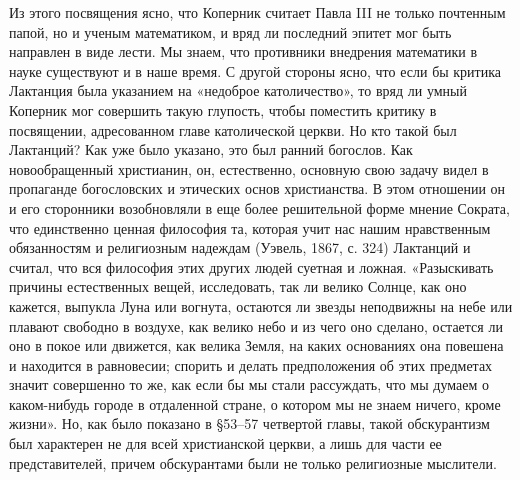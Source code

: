 Из этого  посвящения ясно,  что Коперник считает  Павла III  не только
почтенным папой, но  и ученым математиком, и вряд  ли последний эпитет
мог быть  направлен в виде  лести. Мы знаем, что  противники внедрения
математики  в  науке существуют  и  в  наше  время. С  другой  стороны
ясно,  что  если бы  критика  Лактанция  была указанием  на  «недоброе
католичество», то вряд ли умный Коперник мог совершить такую глупость,
чтобы поместить критику в  посвящении, адресованном главе католической
церкви. Но  кто такой  был Лактанций?  Как уже  было указано,  это был
ранний  богослов.  Как  новообращенный  христианин,  он,  естественно,
основную свою задачу видел в пропаганде богословских и этических основ
христианства.  В этом  отношении он  и его  сторонники возобновляли  в
еще  более решительной  форме мнение  Сократа, что  единственно ценная
философия  та,  которая учит  нас  нашим  нравственным обязанностям  и
религиозным надеждам  (Уэвель, 1867, с.  324) Лактанций и  считал, что
вся философия этих других людей суетная и ложная. «Разыскивать причины
естественных  вещей,  исследовать,  так  ли  велико  Солнце,  как  оно
кажется, выпукла  Луна или вогнута,  остаются ли звезды  неподвижны на
небе или  плавают свободно в  воздухе, как велико  небо и из  чего оно
сделано, остается  ли оно в покое  или движется, как велика  Земля, на
каких  основаниях она  повешена и  находится в  равновесии; спорить  и
делать предположения  об этих предметах  значит совершенно то  же, как
если бы  мы стали рассуждать,  что мы  думаем о каком-нибудь  городе в
отдаленной стране,  о котором  мы не знаем  ничего, кроме  жизни». Но,
как  было  показано  в  §53--57 четвертой  главы,  такой  обскурантизм
был  характерен не  для всей  христианской  церкви, а  лишь для  части
ее  представителей, причем  обскурантами  были  не только  религиозные
мыслители.

